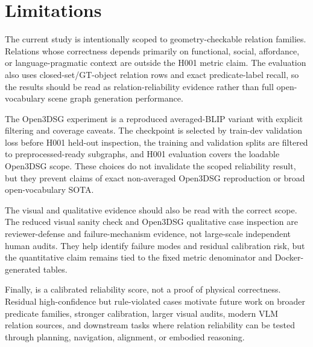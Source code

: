\section{Limitations}

The current study is intentionally scoped to geometry-checkable relation
families. Relations whose correctness depends primarily on functional, social,
affordance, or language-pragmatic context are outside the H001 metric claim.
The evaluation also uses closed-set/GT-object relation rows and exact
predicate-label recall, so the results should be read as relation-reliability
evidence rather than full open-vocabulary scene graph generation performance.

The Open3DSG experiment is a reproduced averaged-BLIP variant with explicit
filtering and coverage caveats. The checkpoint is selected by train-dev
validation loss before H001 held-out inspection, the training and validation
splits are filtered to preprocessed-ready subgraphs, and H001 evaluation covers
the loadable Open3DSG scope. These choices do not invalidate the scoped
reliability result, but they prevent claims of exact non-averaged Open3DSG
reproduction or broad open-vocabulary SOTA.

The visual and qualitative evidence should also be read with the correct scope.
The reduced visual sanity check and Open3DSG qualitative case inspection are
reviewer-defense and failure-mechanism evidence, not large-scale independent
human audits. They help identify failure modes and residual calibration risk,
but the quantitative claim remains tied to the fixed metric denominator and
Docker-generated tables.

Finally, \pgeom{} is a calibrated reliability score, not a proof of physical
correctness. Residual high-confidence but rule-violated cases motivate future
work on broader predicate families, stronger calibration, larger visual audits,
modern VLM relation sources, and downstream tasks where relation reliability can
be tested through planning, navigation, alignment, or embodied reasoning.

